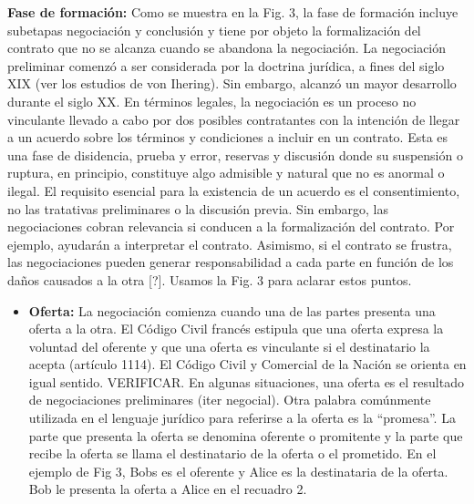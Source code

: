 \documentclass[12pt]{report} %
\begin{document}
\begin{itemize}
\textbf{Fase de formación:} Como se muestra en la Fig. 3, la fase de formación incluye subetapas negociación y conclusión y tiene por objeto la formalización del contrato que no se alcanza cuando se abandona la negociación. La negociación preliminar comenzó a ser considerada por la doctrina jurídica, a fines del siglo XIX (ver los estudios de von Ihering).  Sin embargo, alcanzó un mayor desarrollo durante el siglo XX. En términos legales, la negociación es un proceso no vinculante llevado a cabo por dos posibles contratantes con la intención de llegar a un acuerdo sobre los términos y condiciones a incluir en un contrato. Esta es una fase de disidencia, prueba y error, reservas y discusión donde su suspensión o ruptura, en principio, constituye algo admisible y natural que no es anormal o ilegal. El requisito esencial para la existencia de un acuerdo es el consentimiento, no las tratativas preliminares o la discusión previa. Sin embargo, las negociaciones cobran relevancia si conducen a la formalización del contrato. Por ejemplo, ayudarán a interpretar el contrato. Asimismo, si el contrato se frustra, las negociaciones pueden generar responsabilidad a cada parte en función de los daños causados a la otra [?]. Usamos la Fig. 3 para aclarar estos puntos.
\begin{itemize}
    \item \textbf{ Oferta:} La negociación comienza cuando una de las partes presenta una oferta a la otra. El Código Civil francés  estipula que una oferta expresa la voluntad del oferente y que una oferta es vinculante si el destinatario la acepta (artículo 1114). El Código Civil y Comercial de la Nación se orienta en igual sentido. VERIFICAR. En algunas situaciones, una oferta es el resultado de negociaciones preliminares (iter negocial). Otra palabra comúnmente utilizada en el lenguaje jurídico para referirse a la oferta es la “promesa”. La parte que presenta la oferta se denomina oferente o promitente y la parte que recibe la oferta se llama el destinatario de la oferta o el prometido. En el ejemplo de Fig 3, Bobs es el oferente y Alice es la destinataria de la oferta. Bob le presenta la oferta a Alice en el recuadro 2.

\end{itemize}
\end{itemize}
\end{document}
